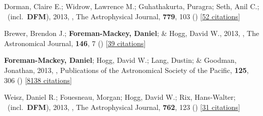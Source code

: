 \item[{\color{numcolor}\scriptsize4}] Dorman, Claire E.; Widrow, Lawrence M.; Guhathakurta, Puragra; Seth, Anil C.; \etal\ (incl.\ \textbf{DFM}), 2013, , The Astrophysical Journal, \textbf{779}, 103 () [\href{https://ui.adsabs.harvard.edu/abs/2013ApJ...779..103D}{52 citations}]

\item[{\color{numcolor}\scriptsize3}] Brewer, Brendon J.; \textbf{Foreman-Mackey, Daniel}; \& Hogg, David W., 2013, , The Astronomical Journal, \textbf{146}, 7 () [\href{https://ui.adsabs.harvard.edu/abs/2013AJ....146....7B}{39 citations}]

\item[{\color{numcolor}\scriptsize2}] \textbf{Foreman-Mackey, Daniel}; Hogg, David W.; Lang, Dustin; \& Goodman, Jonathan, 2013, , Publications of the Astronomical Society of the Pacific, \textbf{125}, 306 () [\href{https://ui.adsabs.harvard.edu/abs/2013PASP..125..306F}{8138 citations}]

\item[{\color{numcolor}\scriptsize1}] Weisz, Daniel R.; Fouesneau, Morgan; Hogg, David W.; Rix, Hans-Walter; \etal\ (incl.\ \textbf{DFM}), 2013, , The Astrophysical Journal, \textbf{762}, 123 () [\href{https://ui.adsabs.harvard.edu/abs/2013ApJ...762..123W}{31 citations}]